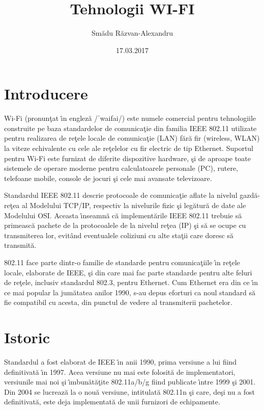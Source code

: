\documentclass{article}
\title{Tehnologii WI-FI}
\author{Sm\u adu R\u azvan-Alexandru}
\date{17.03.2017}
\begin{document}
\maketitle
\tableofcontents
\vspace{2cm}
\section{Introducere}
\hspace{1cm}Wi-Fi (pronun\c tat \^{\i}n englez\u a /ˈwaifai/) este numele comercial pentru tehno\-logiile construite pe baza standardelor de comunica\c tie din familia IEEE 802.11 utilizate pentru realizarea de re\c tele locale de comunica\c tie (LAN) f\u ar\u a fir (wireless, WLAN) la viteze echivalente cu cele ale re\c telelor cu fir electric de tip Ethernet. Suportul pentru Wi-Fi este furnizat de diferite dispozitive hardware, \c si de aproape toate sistemele de operare moderne pentru calculatoarele personale (PC), rutere, telefoane mobile, console de jocuri \c si cele mai avansate televizoare. \par
Standardul IEEE 802.11 descrie protocoale de comunica\c tie aflate la nivelul gazd\u a-re\c tea al Modelului TCP/IP, respectiv la nivelurile fizic \c si leg\u atur\u a de date ale Modelului OSI. Aceasta \^{\i}nseamn\u a c\u a implement\u arile IEEE 802.11 trebuie s\u a primeasc\u a pachete de la protocoalele de la nivelul re\c tea (IP) \c si s\u a se ocupe cu transmiterea lor, evit\^and eventualele coliziuni cu alte sta\c tii care doresc s\u a transmit\u a. \par
802.11 face parte dintr-o familie de standarde pentru comunica\c tiile \^{\i}n re\c tele locale, elaborate de IEEE, \c si din care mai fac parte standarde pentru alte feluri de re\c tele, inclusiv standardul 802.3, pentru Ethernet. Cum Ethernet era din ce \^{\i}n ce mai popular la jum\u atatea anilor 1990, s-au depus eforturi ca noul standard s\u a fie compatibil cu acesta, din punctul de vedere al transmiterii pachetelor. \par
\section {Istoric}
Standardul a fost elaborat de IEEE \^{\i}n anii 1990, prima versiune a lui fiind definitivat\u a \^{\i}n 1997. Acea versiune nu mai este folosit\u a de implementatori, versiunile mai noi \c si \^{\i}mbun\u at\u a\c tite 802.11a/b/g fiind publicate \^{\i}ntre 1999 \c si 2001. Din 2004 se lucreaz\u a la o nou\u a versiune, intitulat\u a 802.11n \c si care, de\c si nu a fost definitivat\u a, este deja implementat\u a de unii furnizori de echipamente. \par
\end{document}
